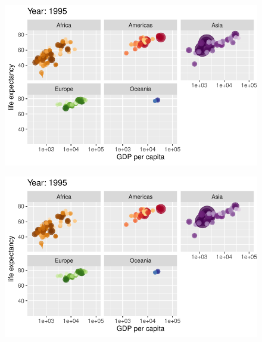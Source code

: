 \documentclass[
  letterpaper,
  DIV=11,
  numbers=noendperiod]{scrartcl}
\begin{document}
\begin{figure}[H]

{\centering \includegraphics{class05_files/figure-pdf/unnamed-chunk-24-78.pdf}

}

\end{figure}

\begin{figure}[H]

{\centering \includegraphics{class05_files/figure-pdf/unnamed-chunk-24-79.pdf}

}

\end{figure}
\end{document}
